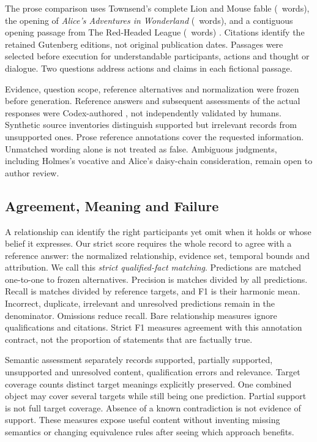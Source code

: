 \documentclass[a4paper,twoside]{article}
\begin{document}
The prose comparison uses Townsend's complete Lion and Mouse fable (\FableWords\ words), the opening of \emph{Alice's Adventures in Wonderland} (\AliceWords\ words), and a contiguous opening passage from The Red-Headed League (\HolmesWords\ words) \cite{aesop,carroll,doyle}. Citations identify the retained Gutenberg editions, not original publication dates. Passages were selected before execution for understandable participants, actions and thought or dialogue. Two questions address actions and claims in each fictional passage.

Evidence, question scope, reference alternatives and normalization were frozen before generation. Reference answers and subsequent assessments of the actual responses were Codex-authored \cite{openai2025}, not independently validated by humans. Synthetic source inventories distinguish supported but irrelevant records from unsupported ones. Prose reference annotations cover the requested information. Unmatched wording alone is not treated as false. Ambiguous judgments, including Holmes's vocative and Alice's daisy-chain consideration, remain open to author review.

\subsection{Agreement, Meaning and Failure}
\noindent A relationship can identify the right participants yet omit when it holds or whose belief it expresses. Our strict score requires the whole record to agree with a reference answer: the normalized relationship, evidence set, temporal bounds and attribution. We call this \emph{strict qualified-fact matching}. Predictions are matched one-to-one to frozen alternatives. Precision is matches divided by all predictions. Recall is matches divided by reference targets, and F1 is their harmonic mean. Incorrect, duplicate, irrelevant and unresolved predictions remain in the denominator. Omissions reduce recall. Bare relationship measures ignore qualifications and citations. Strict F1 measures agreement with this annotation contract, not the proportion of statements that are factually true.

Semantic assessment separately records supported, partially supported, unsupported and unresolved content, qualification errors and relevance. Target coverage counts distinct target meanings explicitly preserved. One combined object may cover several targets while still being one prediction. Partial support is not full target coverage. Absence of a known contradiction is not evidence of support. These measures expose useful content without inventing missing semantics or changing equivalence rules after seeing which approach benefits.
\end{document}
